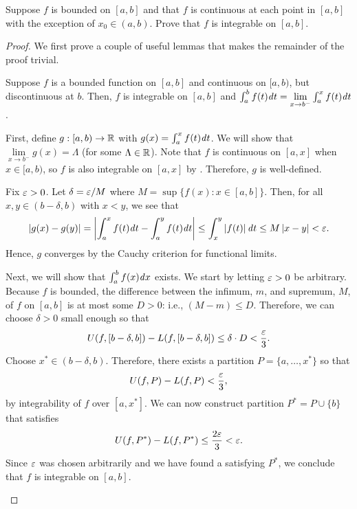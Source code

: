 \begin{problem}
  Suppose $f$ is bounded on $[a, b]$ and that $f$ is continuous at each point in $[a, b]$
  with the exception of $x_{0} \in (a, b)$. Prove that $f$ is integrable on $[a, b]$.

  \begin{proof}
    We first prove a couple of useful lemmas that makes the remainder of the proof trivial.

    \begin{lemma}
      \label{lem:discontinuous-endpoint-integrable}
      Suppose $f$ is a bounded function on $[a, b]$ and continuous on $[a, b)$, but discontinuous at $b$. 
      Then, $f$ is integrable on $[a, b]$ and $\int_{a}^{b} f(t) \mathit{d} t = \lim\limits_{x \to b^{-}} \int_{a}^{x} f(t) \mathit{d} t$.
    \end{lemma}

    \begin{subproof}
      First, define $g : [a, b) \to \mathbb{R}$ with $ g(x) = \int_{a}^{x} f(t) \mathit{d} t$.
      We will show that $\lim\limits_{x \to b^{-}} g(x) = \Lambda$ (for some $\Lambda \in \mathbb{R}$).
      Note that $f$ is continuous on $[a, x]$ when $x \in [a, b)$, so $f$ is also integrable on $[a, x]$ 
      by . Therefore, $g$ is well-defined.
      
      Fix $\varepsilon > 0$. Let $\delta = \varepsilon/M$ where $M = \sup \{ f(x) : x \in [a, b] \}$. Then, for all $x, y \in (b - \delta, b)$ with $x < y$,
      we see that
      \[
        \left\lvert g(x) - g(y) \right\rvert = \left\lvert  \int_{a}^{x} f(t) \mathit{d} t - \int_{a}^{y} f(t) \mathit{d} t  \right\rvert \leq \int_{x}^{y} \left\lvert  f(t)  \right\rvert \mathit{d} t \leq M \left\lvert x - y \right\rvert < \varepsilon.
      \]
      Hence, $g$ converges by the Cauchy criterion for functional limits.

      Next, we will show that $\int_{a}^{b} f(x) \mathit{d} x$ exists. We start by letting $\varepsilon > 0$ be arbitrary. 
      Because $f$ is bounded, the difference between the infimum, $m$, and supremum, $M$, of $f$ on $[a, b]$
      is at most some $D > 0$: i.e., $(M - m) \leq D$. Therefore, we can choose $\delta > 0$ small enough 
      so that 
      \[
        U(f, [b - \delta, b]) - L(f, [b - \delta, b]) \leq \delta \cdot D < \frac{\varepsilon}{3}.
      \]
      Choose $x^{*} \in (b - \delta, b)$. Therefore, there exists a partition $P = \{a, \ldots, x^{*} \}$
      so that
      \[
        U(f, P) - L(f, P) < \frac{\varepsilon}{3},
      \]
      by integrability of $f$ over $[a, x^{*}]$.
      We can now construct partition $P^{*} = P \cup \{ b \}$ that satisfies
      \[
        U(f, P^{*}) - L(f, P^{*}) \leq \frac{2 \varepsilon}{3} < \varepsilon.
      \]
      Since $\varepsilon$ was chosen arbitrarily and we have found a satisfying $P^{*}$, we conclude that $f$
      is integrable on $[a, b]$.


\end{subproof}
\end{proof}
\end{problem}
